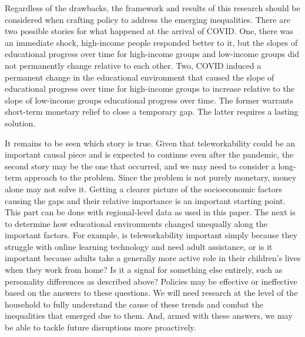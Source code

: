 	Regardless of the drawbacks, the framework and results of this research should be considered when crafting policy to address the emerging inequalities. There are two possible stories for what happened at the arrival of COVID. One, there was an immediate shock, high-income people responded better to it, but the slopes of educational progress over time for high-income groups and low-income groups did not permanently change relative to each other. Two, COVID induced a permanent change in the educational environment that caused the slope of educational progress over time for high-income groups to increase relative to the slope of low-income groups educational progress over time. The former warrants short-term monetary relief to close a temporary gap. The latter requires a lasting solution. \par
It remains to be seen which story is true. Given that teleworkability could be an important causal piece and is expected to continue even after the pandemic, the second story may be the one that occurred, and we may need to consider a long-term approach to the problem. Since the problem is not purely monetary, money alone may not solve it.  Getting a clearer picture of the socioeconomic factors causing the gaps and their relative importance is an important starting point. This part can be done with regional-level data as used in this paper. The next is to determine how educational environments changed unequally along the important factors. For example, is teleworkability important simply because they struggle with online learning technology and need adult assistance, or is it important because adults take a generally more active role in their children’s lives when they work from home? Is it a signal for something else entirely, such as personality differences as described above? Policies may be effective or ineffective based on the answers to these questions. We will need research at the level of the household to fully understand the cause of these trends and combat the inequalities that emerged due to them. And, armed with these answers, we may be able to tackle future disruptions more proactively.

